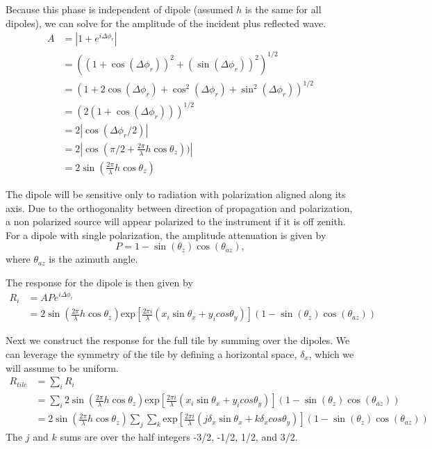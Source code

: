 \documentclass{article}
\begin{document}
Because this phase is independent of dipole (assumed $h$ is the same for all dipoles), we can solve for the amplitude of the incident plus reflected wave.
\begin{subequations}
\begin{align}
A & = \left|1 + e^{i \Delta \phi_r} \right| \\
& = \left( (1 + \cos(\Delta \phi_r))^2 + (\sin(\Delta \phi_r))^2\right)^{1/2} \\
& = \left(1 + 2\cos(\Delta \phi_r) + \cos^2(\Delta\phi_r) + \sin^2(\Delta\phi_r) \right)^{1/2} \\
& = \left(2(1+\cos(\Delta \phi_r))\right)^{1/2} \\
& = 2 \left|\cos(\Delta \phi_r/2)\right| \\
& = 2 \left|\cos\left(\pi/2 + \frac{2 \pi}{\lambda}h \cos\theta_z\right))\right| \\
& = 2 \sin\left(\frac{2 \pi}{\lambda}h \cos\theta_z\right)
\end{align}
\end{subequations}

The dipole will be sensitive only to radiation with polarization aligned along its axis. Due to the orthogonality between direction of propagation and polarization, a non polarized source will appear polarized to the instrument if it is off zenith. For a dipole with single polarization, the amplitude attenuation is given by
\begin{equation}
P = 1-\sin(\theta_z)\cos(\theta_{az}),
\end{equation}
where $\theta_{az}$ is the azimuth angle.

The response for the dipole is then given by
\begin{subequations}
\begin{align}
R_i &= APe^{i \Delta \phi_i} \\
& = 2 \sin\left(\frac{2\pi}{\lambda}h\cos\theta_z\right) \mathrm{exp}\left[\frac{2\pi i}{\lambda}(x_i \sin\theta_x + y_i cos\theta_y)\right]\left(1-\sin(\theta_z)\cos(\theta_{az})\right)
\end{align}
\end{subequations}

Next we construct the response for the full tile by summing over the dipoles. We can leverage the symmetry of the tile by defining a horizontal space, $\delta_x$, which we will assume to be uniform.
\begin{subequations}
\begin{align}
R_{tile} &= \sum_i R_i \\
& = \sum_i 2 \sin\left(\frac{2\pi}{\lambda}h\cos\theta_z\right) \mathrm{exp}\left[\frac{2\pi i}{\lambda}(x_i \sin\theta_x + y_i cos\theta_y)\right]\left(1-\sin(\theta_z)\cos(\theta_{az})\right) \\
& = 2 \sin\left(\frac{2\pi}{\lambda}h\cos\theta_z\right) \sum_j \sum_k  \mathrm{exp}\left[\frac{2\pi i}{\lambda}(j \delta_x \sin\theta_x + k \delta_x cos\theta_y)\right]\left(1-\sin(\theta_z)\cos(\theta_{az})\right)
 \end{align}
\end{subequations}
The $j$ and $k$ sums are over the half integers -3/2, -1/2, 1/2, and 3/2.
\end{document}
